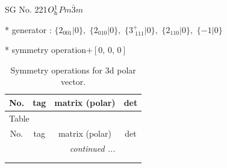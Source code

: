\documentclass[fleqn,8pt]{jsarticle}
\begin{document}
\setcounter{MaxMatrixCols}{32}

\renewcommand{\tablename}{Table~}
\renewcommand{\figurename}{Figure~}
\begin{center}
\LARGE
SG No. 221\quad$O_{\rm h}^{1}$\quad$Pm\bar{3}m$\quad[ cubic ]
\end{center}

* generator : $\{2{}_{001}|0\},\,\,\{2{}_{010}|0\},\,\,\{3^{+}_{\,\,111}|0\},\,\,\{2{}_{110}|0\},\,\,\{-1|0\}$

* symmetry operation\quad$+\left[ 0,\, 0,\, 0 \right]$
\renewcommand{\arraystretch}{1.3}
\begin{longtable}{cccc}
\caption{Symmetry operations for 3d polar vector.}
 \\
 \hline \hline
No. & tag & matrix (polar) & det \\ \hline \endfirsthead

\multicolumn{3}{l}{\tablename\ \thetable{}} \\
 \hline \hline
No. & tag & matrix (polar) & det \\ \hline \endhead

 \hline \hline
\multicolumn{3}{r}{\footnotesize\it continued ...} \\ \endfoot

 \hline \hline
\multicolumn{3}{r}{} \\ \endlastfoot


\end{longtable}
\end{document}
